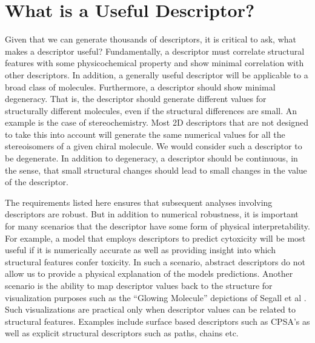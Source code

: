 \documentclass[letterpaper, 12pt]{article}
\begin{document}
\section{What is a Useful Descriptor?}
\label{sec:what-usef-descr}

Given that we can generate thousands of descriptors,  it is critical to ask, what
makes a descriptor useful? Fundamentally, a descriptor must correlate
structural features with some physicochemical property and show
minimal correlation with other descriptors. In addition, a generally
useful descriptor will be applicable to a broad class of
molecules. Furthermore, a descriptor should show minimal
degeneracy. That is, the descriptor should generate different values
for structurally different molecules, even if the structural
differences are small. An example is the case of stereochemistry. Most
2D descriptors that are not designed to take this into account will
generate the same numerical values for all the stereoisomers of a
given chiral molecule. We would consider such a descriptor to be
degenerate. In addition to degeneracy, a descriptor should be
continuous, in the sense, that small structural changes should lead to
small changes in the value of the descriptor.

The requirements listed here ensures that subsequent analyses
involving descriptors are robust. But in addition to numerical
robustness, it is important for many scenarios that the descriptor
have some form of physical interpretability.  For example, a model
that employs descriptors to predict cytoxicity will be most useful if
it is numerically accurate as well as providing insight into which
structural features confer toxicity. In such a scenario, abstract
descriptors do not allow us to provide a physical explanation of the
models predictions. Another scenario is the ability to map descriptor
values back to the structure for visualization purposes such as the
``Glowing Molecule'' depictions of Segall et al
\cite{Segall:2009fk}. Such visualizations are practical only when
descriptor values can be related to structural features. Examples
include surface based descriptors such as CPSA's as well as explicit
structural descriptors such as paths, chains etc.
\end{document}
